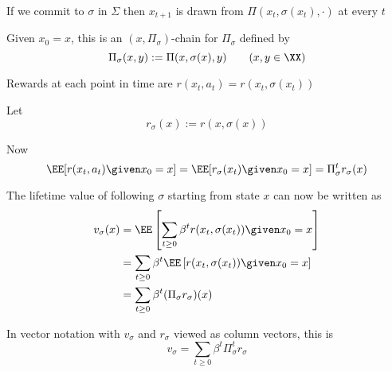 \begin{frame}
    
    If we commit to $\sigma$ in $\Sigma$ 
    then $x_{t+1}$ is drawn from $\Pi(x_t, \sigma(x_t), \cdot)$ at every $t$

    Given $x_0 = x$, this is an $(x, \Pi_\sigma)$-chain for $\Pi_\sigma$ defined by
    \begin{equation*}
        \Pi_\sigma(x, y) := \Pi(x, \sigma(x), y)
        \qquad (x, y \in \XX)
    \end{equation*}

    Rewards at each point in time are $r(x_t, a_t) = r(x_t, \sigma(x_t))$
    
        \vspace{0.5em}
    Let
    \begin{equation*}
        r_\sigma(x) := r(x, \sigma(x))
    \end{equation*}

    Now
    \begin{equation*}
        \EE [ r(x_t, a_t) \given x_0 = x]
        = \EE [ r_\sigma(x_t)  \given x_0 = x]
        = \Pi_\sigma^t r_\sigma (x)
    \end{equation*}

\end{frame}


\begin{frame}
    
    The lifetime value of following $\sigma$ starting from state $x$ can now be written as
    \begin{align*}
        v_\sigma (x) 
        & =
        \EE \left[ 
            \sum_{t \geq 0} \beta^t
            r(x_t, \sigma(x_t)) 
            \given x_0 = x
            \right]
            \\
        & =
        \sum_{t \geq 0} \beta^t
        \EE \left[ 
            r(x_t, \sigma(x_t)) 
            \given x_0 = x
            \right]
            \\
        & = \sum_{t \geq 0} \beta^t (\Pi_\sigma r_\sigma)(x)
    \end{align*}


    In vector notation with $v_\sigma$ and $r_\sigma$ viewed as column
    vectors, this is
    \begin{equation*}
        \label{eq:vsigdc}
        v_\sigma = \sum_{t \geq 0} \beta^t \Pi_\sigma^t r_\sigma
    \end{equation*}

\end{frame}


